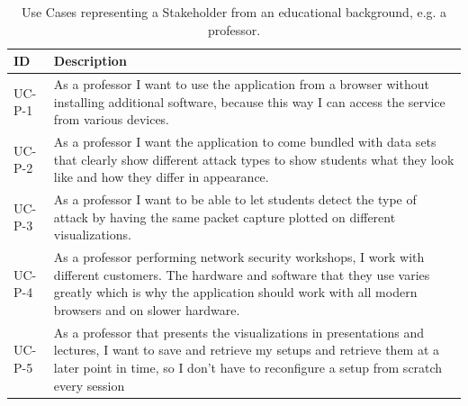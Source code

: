 \begin{table}[]
\centering
\begin{tabular}{|p{1.6cm}|p{12cm}|}
\hline
\textbf{ID} & \textbf{Description} \\ \hline

UC-P-1         & As a professor I want to use the application from a browser without installing additional software, because this way I can access the service from various devices.\\ \hline
UC-P-2        & As a professor I want the application to come bundled with data sets that clearly show different attack types to show students what they look like and how they differ in appearance.\\ \hline
UC-P-3        & As a professor I want to be able to let students detect the type of attack by having the same packet capture plotted on different visualizations.\\ \hline
UC-P-4       & As a professor performing network security workshops, I work with different customers. The hardware and software that they use varies greatly which is why the application should work with all modern browsers and on slower hardware.\\ \hline
UC-P-5      & As a professor that presents the visualizations in presentations and lectures, I want to save and retrieve my setups and retrieve them at a later point in time, so I don't have to reconfigure a setup from scratch every session\\ \hline

\end{tabular}
\caption{Use Cases representing a Stakeholder from an educational background, e.g. a professor.}
\label{table:us-professor}
\end{table} 




